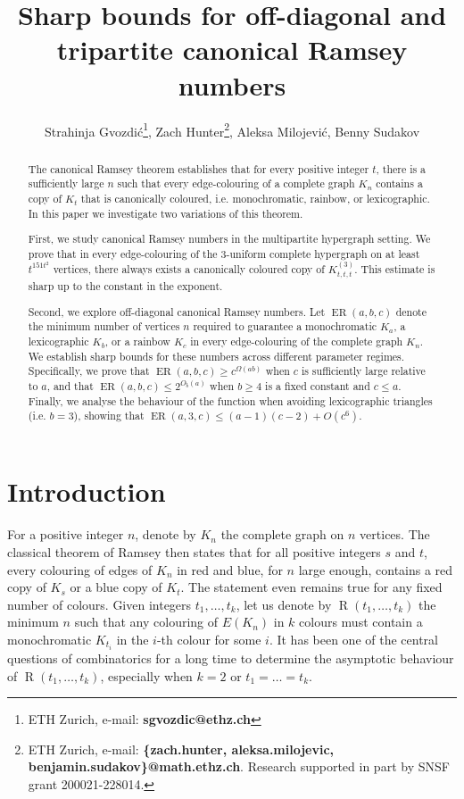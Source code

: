 \documentclass[11pt]{article}
\title{
\vspace{-0.8cm}
Sharp bounds for off-diagonal and tripartite canonical Ramsey numbers}
\author{Strahinja Gvozdi\'c\thanks{ETH Zurich, e-mail: \textbf{sgvozdic@ethz.ch}}, Zach Hunter\thanks{ETH Zurich, e-mail: \textbf{\{zach.hunter, aleksa.milojevic, benjamin.sudakov\}@math.ethz.ch}. Research supported in part by SNSF grant 200021-228014.}, Aleksa Milojevi\'c\footnotemark[2],  Benny Sudakov\footnotemark[2]}
\date{}
\theoremstyle{plain}
\theoremstyle{definition}
\newcommand{\offerado}[3]{\operatorname{ER}(#1,#2,#3)}
\begin{document}
\maketitle

\begin{abstract}
The canonical Ramsey theorem establishes that for every positive integer $t$, there is a sufficiently large $n$ such that every edge-colouring of a complete graph $K_n$ contains a copy of $K_t$ that is canonically coloured, i.e. monochromatic, rainbow, or lexicographic. In this paper we investigate two variations of this theorem.

First, we study canonical Ramsey numbers in the multipartite hypergraph setting. We prove that in every edge-colouring of the 3-uniform complete hypergraph on at least $t^{151t^2}$ vertices, there always exists a canonically coloured copy of $K_{t, t, t}^{(3)}$. This estimate is sharp up to the constant in the exponent.

Second, we explore off-diagonal canonical Ramsey numbers. Let $\offerado abc$ denote the minimum number of vertices $n$ required to guarantee a monochromatic $K_a$, a lexicographic $K_b$, or a rainbow $K_c$ in every edge-colouring of the complete graph $K_n$. We establish sharp bounds for these numbers across different parameter regimes. Specifically, we prove that $\offerado abc\ge c^{\Omega(ab)}$ when $c$ is sufficiently large relative to $a$, and that $\offerado abc\le 2^{O_b(a)}$ when $b\ge 4$ is a fixed constant and $c\le a$. Finally, we analyse the behaviour of the function when avoiding lexicographic triangles (i.e. $b=3$), showing that $\offerado a3c\le (a-1)(c-2)+O(c^6)$.
\end{abstract}


\section{Introduction}\label{sec-intro}

For a positive integer $n$, denote by $K_n$ the complete graph on $n$ vertices. The classical theorem of Ramsey then states that for all positive integers $s$ and $t$, every colouring of edges of $K_n$ in red and blue, for $n$ large enough, contains a red copy of $K_s$ or a blue copy of $K_t$. The statement even remains true for any fixed number of colours. Given integers $t_1,\dots,t_k$, let us denote by $\operatorname{R}(t_1,\dots,t_k)$ the minimum $n$ such that any colouring of $E(K_n)$ in $k$ colours must contain a monochromatic $K_{t_i}$ in the $i$-th colour for some $i$. It has been one of the central questions of combinatorics for a long time to determine the asymptotic behaviour of $\operatorname{R}(t_1,\dots,t_k)$, especially when $k=2$ or $t_1=\dots=t_k$.
\end{document}
